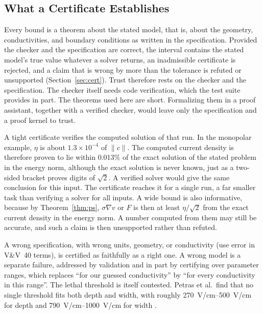 \documentclass[11pt]{article}
\newcommand{\norm}[1]{\lVert #1\rVert}
\begin{document}
\subsection{What a Certificate Establishes} Every bound is a theorem about the
stated model, that is, about the geometry, conductivities, and boundary
conditions as written in the specification. Provided the checker and the specification are correct,
the interval contains the stated model's true value whatever a solver returns,
an inadmissible certificate is rejected, and a claim that is wrong by more than the
tolerance is refuted or unsupported (Section~\ref{sec:cert}). Trust therefore rests on the checker and the
specification. The checker itself needs code verification, which the test suite
provides in part. The theorems used here are short. Formalizing them in a proof
assistant, together with a verified checker, would leave only the specification and a proof kernel to trust.

A tight certificate verifies the computed solution of that run. In the monopolar
example, $\eta$ is about $1.3\times10^{-4}$ of $\norm{c}$. The computed current
density is therefore proven to lie within 0.013\% of the exact solution of the
stated problem in the energy norm, although the exact solution is never known,
just as a two-sided bracket proves digits of $\sqrt2$. A verified solver would
give the same conclusion for this input. The certificate reaches it for a single
run, a far smaller task than verifying a solver for all inputs. A wide bound is
also informative, because by Theorem~\ref{thm:ps}, $\sigma\nabla v$ or $F$ is then at least
$\eta/\sqrt2$ from the exact current density in the energy norm. A number computed from them may still be accurate, and such a claim is then
unsupported rather than refuted.

A wrong specification, with wrong units, geometry, or conductivity (use error in
V\&V~40 terms), is certified as faithfully as a right one. A wrong model is a
separate failure, addressed by validation and in part by certifying over
parameter ranges, which replaces ``for our guessed conductivity'' by ``for every
conductivity in this range''. The lethal threshold is itself contested. Petras
et al.\ find that no single threshold fits both depth and width, with roughly
\SIrange{270}{500}{V/cm} for depth and \SIrange{790}{1000}{V/cm} for width
\cite{petras2025}.
\end{document}
